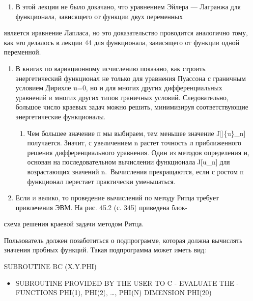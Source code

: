 \documentclass[
  ukrainian,
]{article}
\providecommand{\tightlist}{%
  \setlength{\itemsep}{0pt}\setlength{\parskip}{0pt}}
\begin{document}
\begin{enumerate}
\def\labelenumi{\arabic{enumi}.}
\setcounter{enumi}{1}
\tightlist
\item
  В этой лекции не было докачано, что уравнением Эйлера --- Лагранжа для
  функционала, зависящего от функции двух переменных
\end{enumerate}

является иравнение Лапласа, но это доказательство проводится аналогично
тому, как это делалось в лекции 44 для функционала, зависящего от
функции одной переменной.

\begin{enumerate}
\def\labelenumi{\arabic{enumi}.}
\setcounter{enumi}{2}
\item
  В книгах по вариационному исчислению показано, как строить
  энергетический функционал не только для уравнения Пуассона с граничным
  условием Дирихле u=0, но и для многих других дифференциальных
  уравнений и многих других типов граничных условий. Следовательно,
  большое число краевых задач можно решить, минимизируя соответствующие
  энергетические функционалы.

  \begin{enumerate}
  \def\labelenumii{\arabic{enumii}.}
  \setcounter{enumii}{3}
  \tightlist
  \item
    Чем большее значение п мы выбираем, тем меньшее значение
    J{[}\bar\{u\}\_n{]} получается. Значит, с увеличением n растет
    точность л приближенного решения дифференциального уравнения. Один
    из методов определения и, основан на последовательном вычислении
    функционала J{[}u\_n{]} для возрастающих значений n.~Вычисления
    прекращаются, если с ростом п функционал перестает практически
    уменьшаться.
  \end{enumerate}
\item
  Если и велико, то проведение вычислений по методу Ритца требует
  привлечения ЭВМ. На рис. 45.2 (с. 345) приведена блок-
\end{enumerate}

схема решения краевой задачи методом Ритца.

Пользователь должен позаботиться о подпрограмме, которая должна
вычислять значения пробных функций. Такая подпрограмма может иметь вид:

SUBROUTINE BC (X.Y.PHI)

\begin{itemize}
\tightlist
\item
  SUBROUTINE PROVIDED BY THE USER TO C - EVALUATE THE - FUNCTIONS
  PHI(1), PHI(2), \ldots, PHI(N) DIMENSION PHI(20)
\end{itemize}
\end{document}
